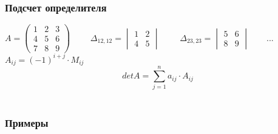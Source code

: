 \documentclass[12pt]{article}
\begin{document}
\subsubsection{Подсчет определителя}

$A = \begin{pmatrix}
	1 & 2 & 3\\
	4 & 5 & 6\\
	7 & 8 & 9
\end{pmatrix} \qquad$
$\Delta_{12, 12} = \begin{vmatrix}
	1 & 2\\4 & 5
\end{vmatrix} \qquad$
$\Delta_{23, 23} = \begin{vmatrix}
	5 & 6\\8 & 9
\end{vmatrix} \qquad ...$\\
$A_{ij} = (-1)^{i+j} \cdot M_{ij}$\\

\[detA = \sum_{j=1}^{n} a_{ij} \cdot A_{ij}\] \hfill\\
\subsubsection{Примеры}
\end{document}
